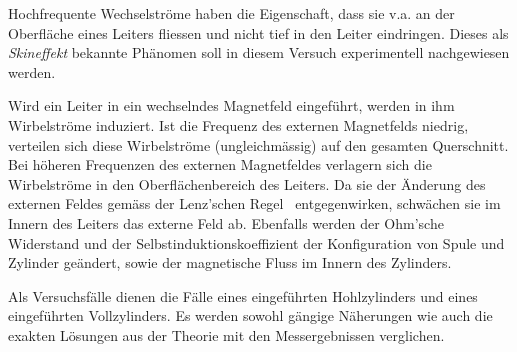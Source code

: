 Hochfrequente  Wechselstr\"ome  haben  die   Eigenschaft,  dass  sie  v.a.  an
der  Oberfl\"ache  eines  Leiters  fliessen  und  nicht  tief  in  den  Leiter
eindringen. Dieses als  \emph{Skineffekt} bekannte  Ph\"anomen soll  in diesem
Versuch experimentell nachgewiesen werden.

Wird  ein  Leiter  in  ein  wechselndes  Magnetfeld  eingef\"uhrt,  werden  in
ihm  Wirbelstr\"ome  induziert. Ist  die  Frequenz  des  externen  Magnetfelds
niedrig,  verteilen  sich  diese  Wirbelstr\"ome  (ungleichm\"assig)  auf  den
gesamten  Querschnitt.  Bei  h\"oheren  Frequenzen  des externen  Magnetfeldes
verlagern   sich   die   Wirbelstr\"ome  in   den   Oberfl\"achenbereich   des
Leiters. Da sie  der \"Anderung  des externen  Feldes gem\"ass  der Lenz'schen
Regel~\cite{ref:wikipedia:lenzscheRegel}  entgegenwirken,  schw\"achen sie  im
Innern  des  Leiters  das  externe  Feld  ab. Ebenfalls  werden  der  Ohm'sche
Widerstand und der Selbstinduktionskoeffizient der Konfiguration von Spule und
Zylinder ge\"andert, sowie der magnetische Fluss im Innern des Zylinders.

Als Versuchsf\"alle dienen die  F\"alle eines eingef\"uhrten Hohlzylinders und
eines  eingef\"uhrten Vollzylinders. Es werden  sowohl g\"angige  N\"aherungen
wie  auch die  exakten  L\"osungen  aus der  Theorie  mit den  Messergebnissen
verglichen.
